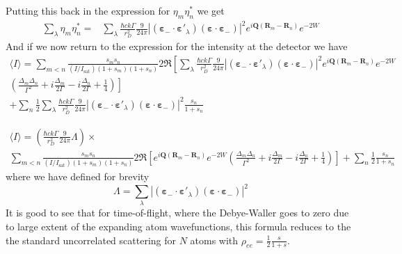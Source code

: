 \documentclass[11pt,letter]{article}
\newcommand{\bv}[1]{\ensuremath{\bm{#1}}}
\begin{document}
Putting this back in the expression for $\eta_{m}\eta_{n}^{*}$ we get
\begin{equation}
\begin{split}
 \sum_{\lambda } \eta_{m}\eta_{n}^{*} = & 
 \sum_{\lambda } \frac{\hbar c k \Gamma}{r_{D}^{2}}  
    \frac{9}{24\pi} 
       | (\bv{\varepsilon}_{-}\cdot \bv{\varepsilon}'_{\lambda} )
                       (\bv{\varepsilon}\cdot \bv{\varepsilon}_{-} ) |^{2}
       e^{ i \bv{Q}( \bv{R}_{m} - \bv{R}_{n} ) } e^{-2W} 
\end{split}
\end{equation}
And if we now return to the expression for the intensity at the detector we have 
\begin{multline}
\langle I \rangle = 
  \sum_{m<n} 
    \frac{ s_{m} s_{n} } { (I/I_{\mathrm{sat}}) ( 1+s_{m} )( 1+s_{n} ) }
    2 \Re\left[ 
         \sum_{\lambda } \frac{\hbar c k \Gamma}{r_{D}^{2}}  
            \frac{9}{24\pi} 
               | (\bv{\varepsilon}_{-}\cdot \bv{\varepsilon}'_{\lambda} )
                               (\bv{\varepsilon}\cdot \bv{\varepsilon}_{-} ) |^{2}
               e^{ i \bv{Q}( \bv{R}_{m} - \bv{R}_{n} ) } e^{-2W} \right. \\ 
    \left.
    \left(
        \frac{ \Delta_{m} \Delta_{n} }{ \Gamma^{2} } 
      + i \frac{ \Delta_{m} }{ 2 \Gamma } 
      - i \frac{ \Delta_{n} }{ 2 \Gamma } 
      + \frac{1}{4}  
    \right) \right] \\ 
  + \sum_{n}  \frac{1}{2}
    \sum_{\lambda} \frac{\hbar c k \Gamma}{r_{D}^{2}}  
    \frac{9}{24\pi} 
       | (\bv{\varepsilon}_{-}\cdot \bv{\varepsilon}'_{\lambda} )
                       (\bv{\varepsilon}\cdot \bv{\varepsilon}_{-} ) |^{2} 
    \frac{ s_{n} } { 1 + s_{n} } 
\end{multline}

\begin{multline}
\label{eq:finalIdetector}
\langle I \rangle =
 \left( 
 \frac{\hbar c k \Gamma}{r_{D}^{2}}  
     \frac{9}{24\pi} \Lambda 
  \right) \times \\
  \sum_{m<n} 
    \frac{ s_{m} s_{n} } { (I/I_{\mathrm{sat}}) ( 1+s_{m} )( 1+s_{n} ) }
    2 \Re\left[ 
               e^{ i \bv{Q}( \bv{R}_{m} - \bv{R}_{n} ) } e^{-2W}  
    \left(
        \frac{ \Delta_{m} \Delta_{n} }{ \Gamma^{2} } 
      + i \frac{ \Delta_{m} }{ 2 \Gamma } 
      - i \frac{ \Delta_{n} }{ 2 \Gamma } 
      + \frac{1}{4}  
    \right) \right]  
  + \sum_{n}  \frac{1}{2}
    \frac{ s_{n} } { 1 + s_{n} } 
\end{multline}
where we have defined for brevity
\begin{equation}
 \Lambda = 
  \sum_{\lambda }
        | (\bv{\varepsilon}_{-}\cdot \bv{\varepsilon}'_{\lambda} )
                        (\bv{\varepsilon}\cdot \bv{\varepsilon}_{-} ) |^{2} 
\end{equation} 
It is good to see that for time-of-flight, where the Debye-Waller goes to zero due to large extent of the expanding atom wavefunctions,  this formula reduces to the the standard uncorrelated scattering for $N$ atoms with $\rho_{ee} = \frac{1}{2} \frac{s}{1+s}$.
\end{document}
